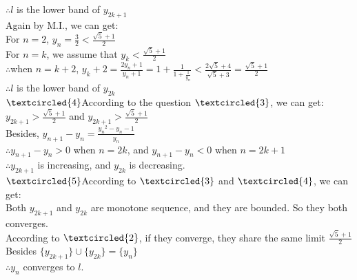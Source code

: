 \documentclass{article}
\begin{document}
\quad\qquad$\therefore$\qquad $l$ is the lower band of $y_{2k+1}$\\

\quad\qquad Again by M.I., we can get:\\

\quad\qquad For $n=2$, $\displaystyle y_n=\frac{3}{2}<\frac{\sqrt{5}+1}{2}$\\

\quad\qquad For $n=k$, we assume that $y_k<\displaystyle \frac{\sqrt{5}+1}{2}$\\

\quad\qquad$\therefore$\qquad when $n=k+2$, $\displaystyle y_k+2=\frac{2y_n+1}{y_n+1}=1+\frac{1}{1+\frac{1}{y_n}}<\frac{2\sqrt{5}+4}{\sqrt{5}+3}=\frac{\sqrt{5}+1}{2}$\\

\quad\qquad$\therefore$\qquad $l$ is the lower band of $y_{2k}$\\

$\textcircled{4}$\qquad According to the question $\textcircled{3}$, we can get:\\

\quad\qquad $\displaystyle y_{2k+1}>\frac{\sqrt{5}+1}{2}$ and $\displaystyle y_{2k+1}>\frac{\sqrt{5}+1}{2}$\\

\quad\qquad Besides, $\displaystyle y_{n+1}-y_n=\frac{{y_n}^2-y_n-1}{y_n}$\\

\quad\qquad $\therefore$\qquad $y_{n+1}-y_n>0$ when $n=2k$, and $y_{n+1}-y_n<0$ when $n=2k+1$\\

\quad\qquad $\therefore$\qquad $y_{2k+1}$ is increasing, and $y_{2k}$ is decreasing.\\

$\textcircled{5}$\qquad According to $\textcircled{3}$ and $\textcircled{4}$, we can get:\\

\quad\qquad Both $y_{2k+1}$ and $y_{2k}$ are monotone sequence, and they are bounded. So they both converges.\\

\quad\qquad According to $\textcircled{2}$, if they converge, they share the same limit $\frac{\sqrt{5}+1}{2}$\\

\quad\qquad Besides $\{y_{2k+1}\}\cup\{y_{2k}\}=\{y_n\}$\\

\quad\qquad $\therefore$\qquad $y_n$ converges to $l$.\\
\end{document}
